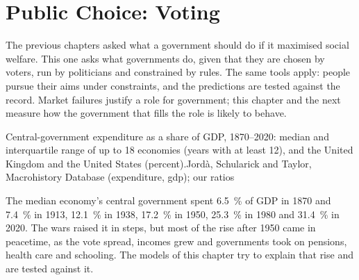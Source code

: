 \chapter{Public Choice: Voting}\label{ch:b3:public-choice-voting}

The previous chapters asked what a government should do if it maximised social
welfare. This one asks what governments do, given that they are chosen by voters,
run by politicians and constrained by rules. The same tools apply: people pursue
their aims under constraints, and the predictions are tested against the record.
Market failures justify a role for government; this chapter and the next measure
how the government that fills the role is likely to behave.

\begin{openingchart}{Central-government expenditure as a share of GDP, 1870--2020:
median and interquartile range of up to 18 economies (years with at least 12), and
the United Kingdom and the United States (percent).}{Jordà, Schularick and Taylor,
Macrohistory Database (expenditure, gdp); our ratios}
\end{openingchart}

The median economy's central government spent 6.5~\% of GDP in 1870 and 7.4~\% in 1913,
12.1~\% in 1938, 17.2~\% in 1950, 25.3~\% in 1980 and 31.4~\% in 2020. The wars raised it in steps,
but most of the rise after 1950 came in peacetime, as the vote spread, incomes grew
and governments took on pensions, health care and schooling. The models of this
chapter try to explain that rise and are tested against it.

